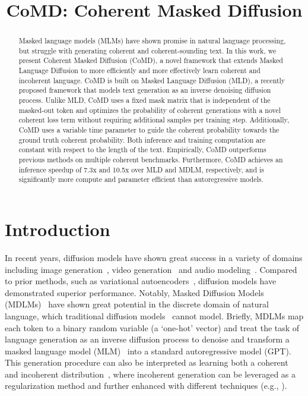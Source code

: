 
\title{CoMD: Coherent Masked Diffusion}

\begin{abstract}
Masked language models (MLMs) have shown promise in natural language processing, but struggle with generating coherent and coherent-sounding text. In this work, we present Coherent Masked Diffusion (CoMD), a novel framework that extends Masked Language Diffusion to more efficiently and more effectively learn coherent and incoherent language. CoMD is built on Masked Language Diffusion (MLD), a recently proposed framework that models text generation as an inverse denoising diffusion process. Unlike MLD, CoMD uses a fixed mask matrix that is independent of the masked-out token and optimizes the probability of coherent generations with a novel coherent loss term without requiring additional samples per training step. Additionally, CoMD uses a variable time parameter to guide the coherent probability towards the ground truth coherent probability. Both inference and training computation are constant with respect to the length of the text. Empirically, CoMD outperforms previous methods on multiple coherent benchmarks. Furthermore, CoMD achieves an inference speedup of 7.3x and 10.5x over MLD and MDLM, respectively, and is significantly more compute and parameter efficient than autoregressive models.
\end{abstract}

\section{Introduction}



In recent years, diffusion models have shown great success in a variety of domains including image generation~\citep{dhariwal2021diffusionmodelsbeatgans}, video generation~\citep{ho2022video} and audio modeling~\citep{chen2020wave}. Compared to prior methods, such as variational autoencoders~\citep{sohldickstein2015deep}, diffusion models have demonstrated superior performance. Notably, Masked Diffusion Models (MDLMs)~\citep{austin2023structured, shih2022training, austin2023structured, liu2024copula} have shown great potential in the discrete domain of natural language, which traditional diffusion models~\citep{ho2020denoising,song2021score} cannot model. Briefly, MDLMs map each token to a binary random variable (a `one-hot' vector) and treat the task of language generation as an inverse diffusion process to denoise and transform a masked language model (MLM)~\citep{devlin-etal-2019-bert} into a standard autoregressive model (GPT). This generation procedure can also be interpreted as learning both a coherent and incoherent distribution~\citep{ou2024absorbing}, where incoherent generation can be leveraged as a regularization method and further enhanced with different techniques (e.g., \citet{shi2025simplified}).


